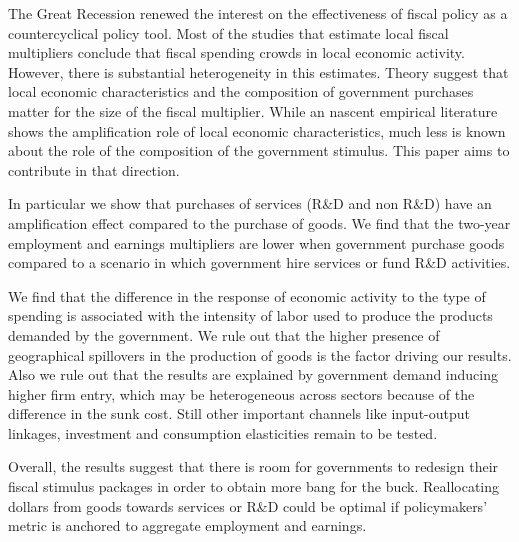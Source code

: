 \documentclass[dv_diss_main.tex]{subfiles}
\begin{document}
The Great Recession renewed the interest on the effectiveness of fiscal policy as a countercyclical policy tool. Most of the studies that estimate local fiscal multipliers conclude that fiscal spending crowds in local economic activity. However, there is substantial heterogeneity in this estimates. Theory suggest that local economic characteristics and the composition of government purchases matter for the size of the fiscal multiplier. While an nascent empirical literature shows the amplification role of local economic characteristics, much less is known about the role of the composition of the government stimulus. This paper aims to contribute in that direction.

In particular we show that purchases of services (R&D and non R&D) have an amplification effect compared to the purchase of goods. We find that the two-year employment and earnings multipliers are lower when government purchase goods compared to a scenario in which government hire services or fund R\&D activities.    

We find that the difference in the response of economic activity to the type of spending is associated with the intensity of labor used to produce the products demanded by the government. We rule out that the higher presence of geographical spillovers in the production of goods is the factor driving our results. Also we rule out that the results are explained by government demand inducing higher firm entry, which may be heterogeneous across sectors because of the difference in the sunk cost. Still other important channels like input-output linkages, investment and consumption elasticities remain to be tested. 

Overall, the results suggest that there is room for governments to redesign their fiscal stimulus packages in order to obtain more bang for the buck. Reallocating dollars from goods towards services or R\&D could be optimal if policymakers' metric is anchored to aggregate employment and earnings. 
\end{document}
